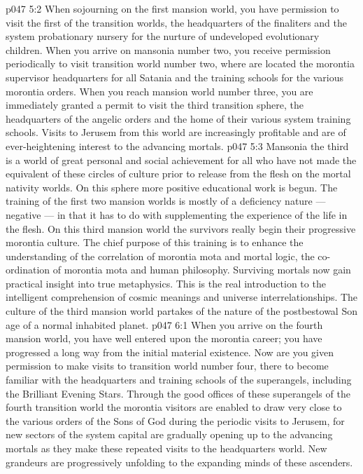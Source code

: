 \vs p047 5:2 When sojourning on the first mansion world, you have permission to visit the first of the transition worlds, the headquarters of the finaliters and the system probationary nursery for the nurture of undeveloped evolutionary children. When you arrive on mansonia number two, you receive permission periodically to visit transition world number two, where are located the morontia supervisor headquarters for all Satania and the training schools for the various morontia orders. When you reach mansion world number three, you are immediately granted a permit to visit the third transition sphere, the headquarters of the angelic orders and the home of their various system training schools. Visits to Jerusem from this world are increasingly profitable and are of ever\hyp{}heightening interest to the advancing mortals.
\vs p047 5:3 Mansonia the third is a world of great personal and social achievement for all who have not made the equivalent of these circles of culture prior to release from the flesh on the mortal nativity worlds. On this sphere more positive educational work is begun. The training of the first two mansion worlds is mostly of a deficiency nature --- negative --- in that it has to do with supplementing the experience of the life in the flesh. On this third mansion world the survivors really begin their progressive morontia culture. The chief purpose of this training is to enhance the understanding of the correlation of morontia mota and mortal logic, the co\hyp{}ordination of morontia mota and human philosophy. Surviving mortals now gain practical insight into true metaphysics. This is the real introduction to the intelligent comprehension of cosmic meanings and universe interrelationships. The culture of the third mansion world partakes of the nature of the postbestowal Son age of a normal inhabited planet.
\vs p047 6:1 When you arrive on the fourth mansion world, you have well entered upon the morontia career; you have progressed a long way from the initial material existence. Now are you given permission to make visits to transition world number four, there to become familiar with the headquarters and training schools of the superangels, including the Brilliant Evening Stars. Through the good offices of these superangels of the fourth transition world the morontia visitors are enabled to draw very close to the various orders of the Sons of God during the periodic visits to Jerusem, for new sectors of the system capital are gradually opening up to the advancing mortals as they make these repeated visits to the headquarters world. New grandeurs are progressively unfolding to the expanding minds of these ascenders.
